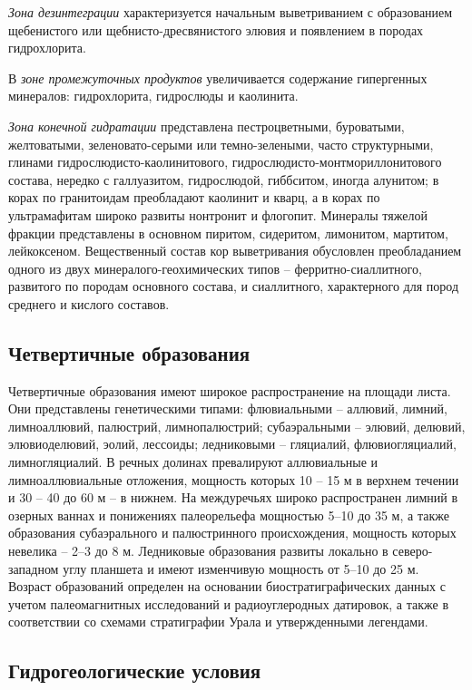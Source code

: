 \textit{Зона дезинтеграции} характеризуется начальным выветриванием с образованием щебенистого или щебнисто-дресвянистого элювия и появлением в породах гидрохлорита. 

В \textit{зоне промежуточных продуктов} увеличивается содержание гипергенных минералов: гидрохлорита, гидрослюды и каолинита. 

\textit{Зона конечной гидратации} представлена пестроцветными, буроватыми, желтоватыми, зеленовато-серыми или темно-зелеными, часто структурными, глинами гидро\-слюдисто-каолинитового, гидрослюдисто-монтмориллонитового состава, нередко с галлуазитом, гидрослюдой, гиббситом, иногда алунитом; в корах по гранитоидам преобладают каолинит и кварц, а в корах по ультрамафитам широко развиты нонтронит и флогопит. Минералы тяжелой фракции представлены в основном пиритом, сидеритом, лимонитом, мартитом, лейкоксеном. Вещественный состав кор выветривания обусловлен преобладанием одного из двух минералого-геохимических типов – ферритно-сиаллитного, развитого по породам основного состава, и сиаллитного, характерного для пород среднего и кислого составов.

\subsection*{Четвертичные образования}
Четвертичные образования имеют широкое распространение на площади листа. Они представлены генетическими типами: флювиальными – аллювий, лимний, лимноаллювий, палюстрий, лимнопалюстрий; субаэральными – элювий, делювий, элювиоделювий, эолий, лессоиды; ледниковыми – гляциалий, флювиогляциалий, лимногляциалий. В речных долинах превалируют аллювиальные и лимноаллювиальные отложения, мощность которых 10 – 15 м в верхнем течении и 30 – 40 до 60 м – в нижнем. На междуречьях широко распространен лимний в озерных ваннах и понижениях палеорельефа мощностью 5–10 до 35 м, а также образования субаэрального и палюстринного происхождения, мощность которых невелика – 
2–3 до 8 м. Ледниковые образования развиты локально в северо-западном углу планшета и имеют изменчивую мощность от 5–10 до 25 м.
Возраст образований определен на основании биостратиграфических данных с учетом палеомагнитных исследований и радиоуглеродных датировок, а также в соответствии со схемами стратиграфии Урала и утвержденными легендами.

\subsection*{Гидрогеологические условия}
%
\hydrogeology

